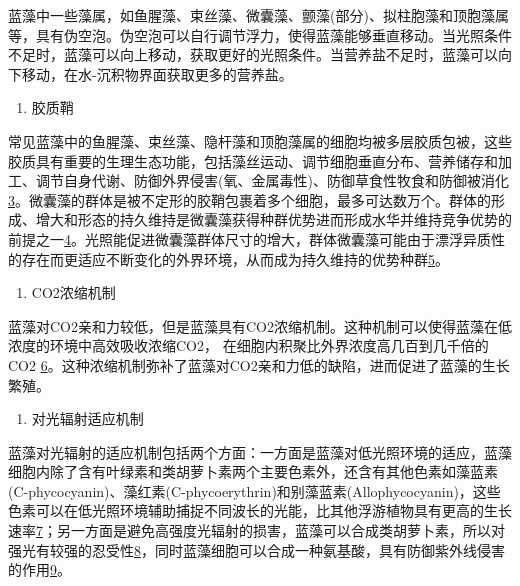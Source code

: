 \documentclass[]{book}
\providecommand{\tightlist}{%
  \setlength{\itemsep}{0pt}\setlength{\parskip}{0pt}}
\begin{document}
蓝藻中一些藻属，如鱼腥藻、束丝藻、微囊藻、颤藻(部分)、拟柱胞藻和顶胞藻属等，具有伪空泡。伪空泡可以自行调节浮力，使得蓝藻能够垂直移动。当光照条件不足时，蓝藻可以向上移动，获取更好的光照条件。当营养盐不足时，蓝藻可以向下移动，在水-沉积物界面获取更多的营养盐。

\begin{enumerate}
\def\labelenumi{\arabic{enumi}.}
\setcounter{enumi}{1}
\tightlist
\item
  胶质鞘
\end{enumerate}

常见蓝藻中的鱼腥藻、束丝藻、隐杆藻和顶胞藻属的细胞均被多层胶质包被，这些胶质具有重要的生理生态功能，包括藻丝运动、调节细胞垂直分布、营养储存和加工、调节自身代谢、防御外界侵害(氧、金属毒性)、防御草食性牧食和防御被消化\href{Puga\%20A\%20P,\%20Abreu\%20C\%20A,\%20et\%20al.\%20J.\%20of\%20Environ.\%20Manage.,\%202015,\%20159:\%2086–93.}{3}。微囊藻的群体是被不定形的胶鞘包裹着多个细胞，最多可达数万个。群体的形成、增大和形态的持久维持是微囊藻获得种群优势进而形成水华并维持竞争优势的前提之一\href{Khan\%20S,\%20Cai\%20Chao,\%20et\%20al．\%20Environ.\%20Sci.\%20\&\%20Technol.,\%202013,\%2047\%20:\%208624-8632．}{4}。光照能促进微囊藻群体尺寸的增大，群体微囊藻可能由于漂浮异质性的存在而更适应不断变化的外界环境，从而成为持久维持的优势种群\href{Bi\%20H,\%20Huang\%20X,\%20et\%20al.\%20Small\%202014,\%2010,\%203544.}{5}。

\begin{enumerate}
\def\labelenumi{\arabic{enumi}.}
\setcounter{enumi}{2}
\tightlist
\item
  CO2浓缩机制
\end{enumerate}

蓝藻对CO2亲和力较低，但是蓝藻具有CO2浓缩机制。这种机制可以使得蓝藻在低浓度的环境中高效吸收浓缩CO2， 在细胞内积聚比外界浓度高几百到几千倍的 CO2 \href{Gupta\%20V\%20K,\%20Ganjali\%20M\%20R,\%20et\%20al.\%20Chemical\%20Engineering\%20Journal,\%202012,\%20197:\%20330.}{6}。这种浓缩机制弥补了蓝藻对CO2亲和力低的缺陷，进而促进了蓝藻的生长繁殖。

\begin{enumerate}
\def\labelenumi{\arabic{enumi}.}
\setcounter{enumi}{3}
\tightlist
\item
  对光辐射适应机制
\end{enumerate}

蓝藻对光辐射的适应机制包括两个方面：一方面是蓝藻对低光照环境的适应，蓝藻细胞内除了含有叶绿素和类胡萝卜素两个主要色素外，还含有其他色素如藻蓝素(C-phycocyanin)、藻红素(C-phycoerythrin)和别藻蓝素(Allophycocyanin)，这些色素可以在低光照环境辅助捕捉不同波长的光能，比其他浮游植物具有更高的生长速率\href{Liu\%20R\%20L,\%20Liu\%20Y,\%20et\%20al.\%20Bioresourse\%20Technology\%202014,\%20154:\%20138.}{7}；另一方面是避免高强度光辐射的损害，蓝藻可以合成类胡萝卜素，所以对强光有较强的忍受性\href{Gao\%20F,Qu\%20J\%20Y,\%20et\%20al.\%20Electrochim.\%20Acta\%202016,\%20190:\%201134.}{8}，同时蓝藻细胞可以合成一种氨基酸，具有防御紫外线侵害的作用\href{Jiang\%20J,\%20Zhu\%20J\%20H,\%20et\%20al.\%20Energy\%20Environ.\%20Sci.\%202014,\%207:\%202670.}{9}。
\end{document}
